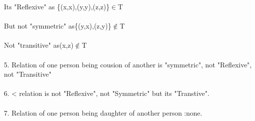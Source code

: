\documentclass[a4paper,english,12pt]{article}
\begin{document}
 Its "Reflexive" as           \{(x,x),(y,y),(z,z)\}$\in$T\\\\
 But not "symmetric" as\{(y,x),(z,y)\}$\notin$T\\\\
 Not "transitive" as(x,z)$\notin$T\\\\
5. Relation of one person being cousion of    another is "symmetric", not "Reflexive", not "Transitive"\\\\
6. < relation is not "Reflexive", not "Symmetric" but its "Transtive".\\\\
7. Relation of one person being daughter of another person :none.\\\\
\end{document}

